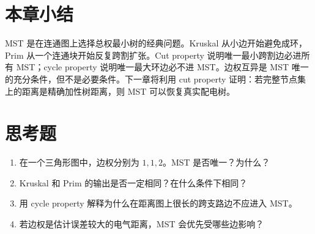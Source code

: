 \section{本章小结}

MST 是在连通图上选择总权最小树的经典问题。Kruskal 从小边开始避免成环，Prim 从一个连通块开始反复跨割扩张。Cut property 说明唯一最小跨割边必进所有 MST；cycle property 说明唯一最大环边必不进 MST。边权互异是 MST 唯一的充分条件，但不是必要条件。下一章将利用 cut property 证明：若完整节点集上的距离是精确加性树距离，则 MST 可以恢复真实配电树。

\section*{思考题}
\begin{enumerate}
  \item 在一个三角形图中，边权分别为 $1,1,2$。MST 是否唯一？为什么？
  \item Kruskal 和 Prim 的输出是否一定相同？在什么条件下相同？
  \item 用 cycle property 解释为什么在距离图上很长的跨支路边不应进入 MST。
  \item 若边权是估计误差较大的电气距离，MST 会优先受哪些边影响？
\end{enumerate}

